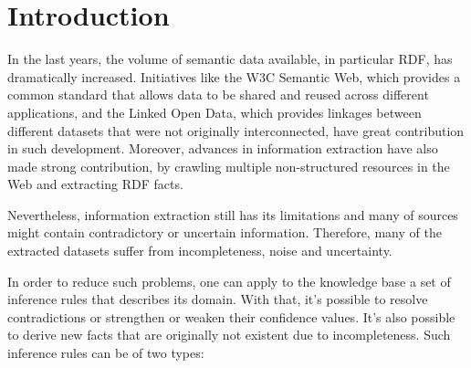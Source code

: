 \chapter{Introduction}
\label{ch:intro}

In the last years, the volume of semantic data available, in particular RDF, has dramatically increased. Initiatives
like the W3C Semantic Web, which provides a common standard that allows data to be shared and reused across different
applications, and the Linked Open Data, which provides linkages between different datasets that were not originally
interconnected, have great contribution in such development. Moreover, advances in information extraction have also made
strong contribution, by crawling multiple non-structured resources in the Web and extracting RDF facts.

Nevertheless, information extraction still has its limitations and many of sources might contain contradictory
or uncertain information. Therefore, many of the extracted datasets suffer from incompleteness, noise and uncertainty.

In order to reduce such problems, one can apply to the knowledge base a set of inference rules that describes its
domain. With that, it's possible to resolve contradictions or strengthen or weaken their confidence values. It's also
possible to derive new facts that are originally not existent due to incompleteness. Such inference rules can be of two
types:

